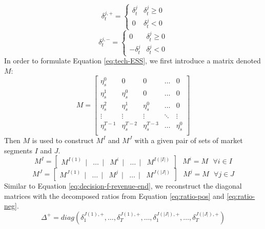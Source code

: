 \begin{equation}
\label{eq:ratio-pos}
\delta_t^{j,+} = \begin{cases}
\delta_t^j & \delta_t^j  \geq 0\\
0 & \delta_t^j  < 0
\end{cases}
\end{equation}
\begin{equation}
\label{eq:ratio-neg}
\delta_t^{j,-} = \begin{cases}
0 & \delta_t^j  \geq 0\\
-\delta_t^j & \delta_t^j  < 0
\end{cases}
\end{equation}
\newline
In order to formulate Equation \eqref{eq:tech-ESS}, we first introduce a matrix denoted $M$:
\[
M
=
\begin{bmatrix}
\eta_s^0 & 0 & 0 &  \dots & 0 \\
\eta_s^1 & \eta_s^0 & 0 &  \dots & 0 \\
\eta_s^2 & \eta_s^1 & \eta_s^0 &  \dots & 0 \\
\vdots & \vdots & \vdots &  \ddots & \vdots \\
\eta_s^{T-1} & \eta_s^{T-2} & \eta_s^{T-3} & \dots & \eta_s^0 \\
\end{bmatrix}
\]
\newline
Then $M$ is used to construct $M^I$ and $M^J$ with a given pair of sets of market segments $I$ and $J$.
\begin{equation*}
M^I = \begin{bmatrix}
M^{I(1)}~~|&\dots~~|&M^i~~|&\dots~~|&M^{I(|I|)}
\end{bmatrix}~~~
M^i = M ~~~ \forall i \in I
\end{equation*}
\begin{equation*}
M^J = \begin{bmatrix}
M^{J(1)}~~|&\dots~~|&M^j~~|&\dots~~|&M^{J(|J|)}
\end{bmatrix}~~~
M^j = M ~~~ \forall j \in J
\end{equation*}
\newline
Similar to Equation \eqref{eq:decision-f-revenue-end}, we reconstruct the diagonal matrices with the decomposed ratios from Equation \eqref{eq:ratio-pos} and \eqref{eq:ratio-neg}.
\begin{equation*}
\Delta^+ = diag (
\delta_1^{J(1),+}, \dots , \delta_T^{J(1),+}, \dots, \delta_1^{J(|J|),+}, \dots, \delta_T^{J(|J|),+})
\end{equation*}
